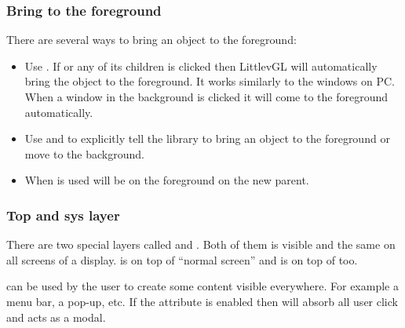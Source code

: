\documentclass[letterpaper,10pt,english]{sphinxmanual}
\begin{document}
\subsubsection{Bring to the foreground}
\label{\detokenize{overview/layers:bring-to-the-foreground}}
There are several ways to bring an object to the foreground:
\begin{itemize}
\item {} 
Use . If  or any of its children is clicked then LittlevGL will automatically bring the object to the foreground.
It works similarly to the windows on PC. When a window in the background is clicked it will come to the foreground automatically.

\item {} 
Use  and  to explicitly tell the library to bring an object to the foreground or move to the background.

\item {} 
When  is used  will be on the foreground on the new parent.

\end{itemize}


\subsubsection{Top and sys layer}
\label{\detokenize{overview/layers:top-and-sys-layer}}
There are two special layers called  and .
Both of them is visible and the same on all screens of a display.  is on top of “normal screen” and  is on top of  too.

 can be used by the user to create some content visible everywhere. For example a menu bar, a pop-up, etc. If the  attribute is enabled then  will absorb all user click and acts as a modal.

\begin{sphinxVerbatim}[commandchars=\\\{\}]
 
\end{sphinxVerbatim}
\end{document}
